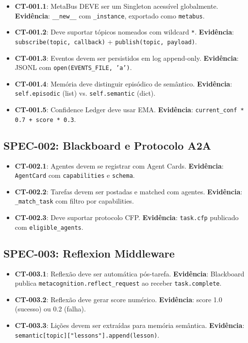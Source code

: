 \begin{itemize}
    \item[\checkmark] \textbf{CT-001.1}: MetaBus DEVE ser um Singleton acessível globalmente. \textbf{Evidência}: \texttt{\_\_new\_\_} com \texttt{\_instance}, exportado como \texttt{metabus}.
    \item[\checkmark] \textbf{CT-001.2}: Deve suportar tópicos nomeados com wildcard \texttt{*}. \textbf{Evidência}: \texttt{subscribe(topic, callback)} + \texttt{publish(topic, payload)}.
    \item[\checkmark] \textbf{CT-001.3}: Eventos devem ser persistidos em log append-only. \textbf{Evidência}: JSONL com \texttt{open(EVENTS\_FILE, 'a')}.
    \item[\checkmark] \textbf{CT-001.4}: Memória deve distinguir episódico de semântico. \textbf{Evidência}: \texttt{self.episodic} (list) vs. \texttt{self.semantic} (dict).
    \item[\checkmark] \textbf{CT-001.5}: Confidence Ledger deve usar EMA. \textbf{Evidência}: \texttt{current\_conf * 0.7 + score * 0.3}.
\end{itemize}

\subsection{SPEC-002: Blackboard e Protocolo A2A}

\begin{itemize}
    \item[\checkmark] \textbf{CT-002.1}: Agentes devem se registrar com Agent Cards. \textbf{Evidência}: \texttt{AgentCard} com \texttt{capabilities} e \texttt{schema}.
    \item[\checkmark] \textbf{CT-002.2}: Tarefas devem ser postadas e matched com agentes. \textbf{Evidência}: \texttt{\_match\_task} com filtro por capabilities.
    \item[\checkmark] \textbf{CT-002.3}: Deve suportar protocolo CFP. \textbf{Evidência}: \texttt{task.cfp} publicado com \texttt{eligible\_agents}.
\end{itemize}

\subsection{SPEC-003: Reflexion Middleware}

\begin{itemize}
    \item[\checkmark] \textbf{CT-003.1}: Reflexão deve ser automática pós-tarefa. \textbf{Evidência}: Blackboard publica \texttt{metacognition.reflect\_request} ao receber \texttt{task.complete}.
    \item[\checkmark] \textbf{CT-003.2}: Reflexão deve gerar score numérico. \textbf{Evidência}: score 1.0 (sucesso) ou 0.2 (falha).
    \item[\checkmark] \textbf{CT-003.3}: Lições devem ser extraídas para memória semântica. \textbf{Evidência}: \texttt{semantic[topic]["lessons"].append(lesson)}.
\end{itemize}

